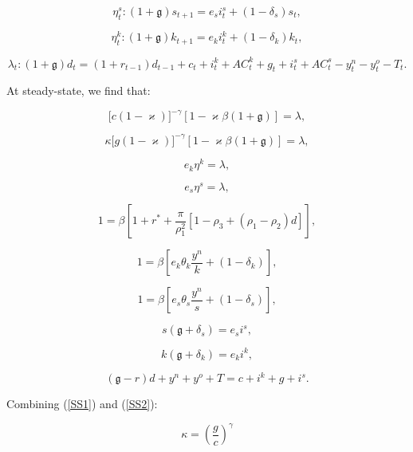 \documentclass[11pt]{article}
\begin{document}
\begin{equation}
\eta _{t}^{s}:(1+\mathfrak{g})s_{t+1}=e_{s}i_{t}^{s}+(1-\delta _{s})s_{t},
\label{A8}
\end{equation}

\begin{equation}
\eta _{t}^{k}:(1+\mathfrak{g})k_{t+1}=e_{k}i_{t}^{k}+(1-\delta _{k})k_{t},
\label{A9}
\end{equation}

\begin{equation}
\lambda _{t}:(1+\mathfrak{g}%
)d_{t}=(1+r_{t-1})d_{t-1}+c_{t}+i_{t}^{k}+AC_{t}^{k}+g_{t}+i_{t}^{s}+AC_{t}^{s}-y_{t}^{n}-y_{t}^{o}-T_{t}.
\label{A10}
\end{equation}

At steady-state, we find that:

\begin{equation}
\lbrack c(1-\varkappa )]^{-\gamma }[1-\varkappa \beta (1+\mathfrak{g}%
)]=\lambda ,  \label{SS1}
\end{equation}

\begin{equation}
\kappa \lbrack g(1-\varkappa )]^{-\gamma }[1-\varkappa \beta (1+\mathfrak{g}%
)]=\lambda ,  \label{SS2}
\end{equation}

\begin{equation}
e_{k}\eta ^{k}=\lambda ,  \label{SS3}
\end{equation}

\begin{equation}
e_{s}\eta ^{s}=\lambda ,  \label{SS4}
\end{equation}

\begin{equation}
1=\beta \left[ 1+r^{\ast }+\frac{\pi }{\rho _{1}^{2}}[1-\rho _{3}+(\rho
_{1}-\rho _{2})d]\right] ,  \label{SS5}
\end{equation}

\begin{equation}
1=\beta \left[ e_{k}\theta _{k}\frac{y^{n}}{k}+(1-\delta _{k})\right] ,
\label{SS6}
\end{equation}

\begin{equation}
1=\beta \left[ e_{s}\theta _{s}\frac{y^{n}}{s}+(1-\delta _{s})\right] ,
\label{SS7}
\end{equation}

\begin{equation}
s(\mathfrak{g}+\delta _{s})=e_{s}i^{s},  \label{SS8}
\end{equation}

\begin{equation}
k(\mathfrak{g}+\delta _{k})=e_{k}i^{k},  \label{SS9}
\end{equation}

\begin{equation}
(\mathfrak{g}-r)d+y^{n}+y^{o}+T=c+i^{k}+g+i^{s}.  \label{SS10}
\end{equation}

Combining (\ref{SS1}) and (\ref{SS2}):

\begin{equation}
\kappa =\left( \frac{g}{c}\right) ^{\gamma }  \label{SS11}
\end{equation}
\end{document}
